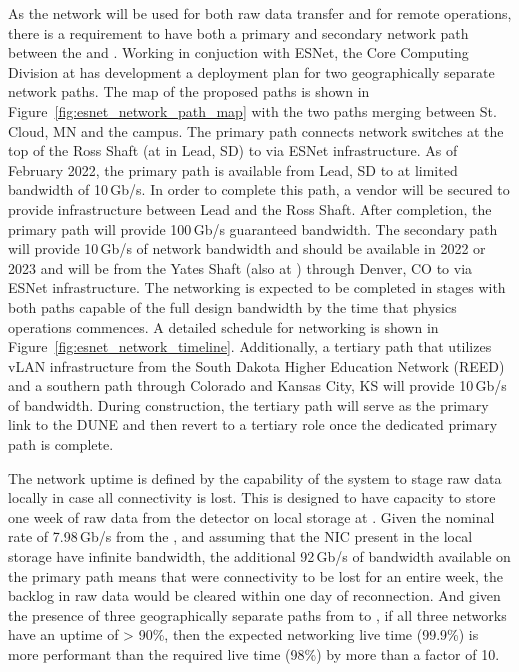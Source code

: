 \documentclass[../main-v1.tex]{subfiles}
\begin{document}
As the network will be used for both raw data transfer and for remote operations, there is a requirement to have both a primary and secondary network path between the  and . Working in conjuction with ESNet, the Core Computing Division at  has development a deployment plan for two geographically separate network paths. The map of the proposed paths is shown in Figure~\ref{fig:esnet_network_path_map} with the two paths merging between St. Cloud, MN and the  campus. The primary path connects network switches at the top of the Ross Shaft (at  in Lead, SD) to  via ESNet infrastructure. As of February 2022, the primary path is available from Lead, SD 
to  at limited bandwidth of 10\,Gb/s. In order to complete this path, a vendor will be secured to provide infrastructure between Lead and the Ross Shaft. After completion, the primary path will provide 100\,Gb/s guaranteed bandwidth. The secondary path will provide 10\,Gb/s of network bandwidth and should be available in %
2022 or 2023 and will be from the Yates Shaft (also at ) through Denver, CO to  via ESNet infrastructure. The networking is expected to be completed in stages with both paths capable of the full design bandwidth by the time that  physics operations commences. A detailed schedule for networking is shown in Figure~\ref{fig:esnet_network_timeline}. Additionally, a tertiary path that utilizes vLAN infrastructure from the South Dakota Higher Education Network (REED) and a southern path through Colorado and Kansas City, KS will provide 10\,Gb/s of bandwidth. During construction, the tertiary path will serve as the primary link to the DUNE  and then revert to a tertiary role once the dedicated primary path is complete.

The network uptime is defined by the capability of the   system to stage raw data locally in case all connectivity is lost. %
This  is designed to have capacity to store one week of raw data from the detector on local storage at . %
Given the nominal rate of 7.98\,Gb/s from the , and assuming that the NIC
 present in the local storage have infinite bandwidth, the additional 92\,Gb/s of bandwidth available on the primary path means that 
were connectivity to be lost for an entire week, 
the backlog in raw data would be cleared within one day of reconnection. And given the presence of three geographically separate paths from  to , if all three networks have an uptime of > 90\%, then the expected networking live time (99.9\%) is more performant than the  required live time (98\%) by more than a factor of 10.
\end{document}
